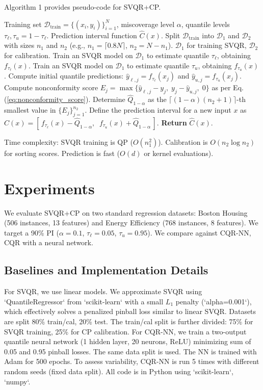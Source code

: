 \documentclass{article}
\begin{document}
Algorithm 1 provides pseudo-code for SVQR+CP.
\begin{algorithm}
\caption{Split Conformal SVQR for Prediction Intervals}
\label{alg:svqr_cp}
\begin{algorithmic}[1]
\Require Training set $\mathcal{D}_{\text{train}} = \{(x_i, y_i)\}_{i=1}^{N}$, miscoverage level $\alpha$, quantile levels $\tau_{\ell}, \tau_{u} = 1-\tau_{\ell}$.
\Ensure Prediction interval function $\hat{C}(x)$.
\State Split $\mathcal{D}_{\text{train}}$ into $\mathcal{D}_1$ and $\mathcal{D}_2$ with sizes $n_1$ and $n_2$ (e.g., $n_1 = \lceil 0.8N \rceil$, $n_2 = N-n_1$). $\mathcal{D}_1$ for training SVQR, $\mathcal{D}_2$ for calibration.
\State Train an SVQR model on $\mathcal{D}_1$ to estimate quantile $\tau_{\ell}$, obtaining $f_{\tau_{\ell}}(x)$.
\State Train an SVQR model on $\mathcal{D}_1$ to estimate quantile $\tau_{u}$, obtaining $f_{\tau_{u}}(x)$.
    \State Compute initial quantile predictions: $\hat{y}_{\ell,j} = f_{\tau_{\ell}}(x_j)$ and $\hat{y}_{u,j} = f_{\tau_{u}}(x_j)$.
    \State Compute nonconformity score $E_j = \max\{\hat{y}_{\ell,j} - y_j,\; y_j - \hat{y}_{u,j},\; 0\}$ as per Eq. (\ref{eq:nonconformity_score}).
\EndFor
\State Determine $\hat{Q}_{1-\alpha}$ as the $\lceil (1-\alpha)(n_2+1) \rceil$-th smallest value in $\{E_j\}_{j=1}^{n_2}$.
\State Define the prediction interval for a new input $x$ as $\hat{C}(x) = [\,f_{\tau_{\ell}}(x) - \hat{Q}_{1-\alpha},\;\; f_{\tau_{u}}(x) + \hat{Q}_{1-\alpha}\,]$.
\State \textbf{Return} $\hat{C}(x)$.
\end{algorithmic}
\end{algorithm}

Time complexity: SVQR training is QP ($O(n_1^2)$). Calibration is $O(n_2 \log n_2)$ for sorting scores. Prediction is fast ($O(d)$ or kernel evaluations).

\section{Experiments}
We evaluate SVQR+CP on two standard regression datasets: Boston Housing (506 instances, 13 features) and Energy Efficiency (768 instances, 8 features). We target a 90\% PI ($\alpha=0.1$, $\tau_{\ell}=0.05$, $\tau_{u}=0.95$). We compare against CQR-NN, CQR with a neural network.

\subsection{Baselines and Implementation Details}
For SVQR, we use linear models. We approximate SVQR using `QuantileRegressor` from `scikit-learn` with a small $L_1$ penalty (`alpha=0.001`), which effectively solves a penalized pinball loss similar to linear SVQR. Datasets are split 80\% train/cal, 20\% test. The train/cal split is further divided: 75\% for SVQR training, 25\% for CP calibration. For CQR-NN, we train a two-output quantile neural network (1 hidden layer, 20 neurons, ReLU) minimizing sum of 0.05 and 0.95 pinball losses. The same data split is used. The NN is trained with Adam for 500 epochs. To assess variability, CQR-NN is run 5 times with different random seeds (fixed data split). All code is in Python using `scikit-learn`, `numpy`.
\end{document}
